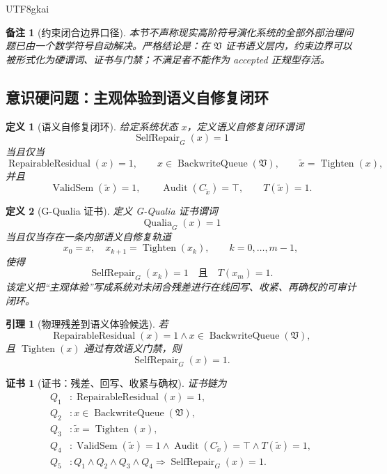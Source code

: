 \documentclass[12pt]{article}
\newtheorem{definition}{定义}[section]
\newtheorem{lemma}{引理}[section]
\newtheorem{remark}{备注}[section]
\newtheorem{Certificate}{证书}[section]
\newcommand{\Vsys}{\mathfrak V}
\DeclareMathOperator{\Audit}{Audit}
\DeclareMathOperator{\BackwriteQueue}{BackwriteQueue}
\DeclareMathOperator{\Tighten}{Tighten}
\DeclareMathOperator{\ValidSem}{ValidSem}
\DeclareMathOperator{\RepairableResidual}{RepairableResidual}
\DeclareMathOperator{\Qualia}{Qualia}
\DeclareMathOperator{\SelfRepair}{SelfRepair}
\begin{document}
\begin{CJK*}{UTF8}{gkai}
\begin{remark}[约束闭合边界口径]
本节不声称现实高阶符号演化系统的全部外部治理问题已由一个数学符号自动解决。严格结论是：在 \(\Vsys\)
证书语义层内，约束边界可以被形式化为硬谓词、证书与门禁；不满足者不能作为 accepted 正规型存活。
\end{remark}

\subsection{意识硬问题：主观体验到语义自修复闭环}
\label{subsec:tex59-consciousness-hard}

\begin{definition}[语义自修复闭环]
\label{def:tex59-self-repair-loop}
给定系统状态 \(x\)，定义语义自修复闭环谓词
\[
  \SelfRepair_G(x)=1
\]
当且仅当
\[
  \RepairableResidual(x)=1,
  \qquad
  x\in\BackwriteQueue(\Vsys),
  \qquad
  \widetilde x=\Tighten(x),
\]
并且
\[
  \ValidSem(\widetilde x)=1,
  \qquad
  \Audit(C_{\widetilde x})=\top,
  \qquad
  T(\widetilde x)=1.
\]
\end{definition}

\begin{definition}[G-Qualia 证书]
\label{def:tex59-qualia-certificate}
定义 G-Qualia 证书谓词
\[
  \Qualia_G(x)=1
\]
当且仅当存在一条内部语义自修复轨道
\[
  x_0=x,\quad x_{k+1}=\Tighten(x_k),
  \qquad k=0,\ldots,m-1,
\]
使得
\[
  \SelfRepair_G(x_k)=1
  \quad\text{且}\quad
  T(x_m)=1.
\]
该定义把“主观体验”写成系统对未闭合残差进行在线回写、收紧、再确权的可审计闭环。
\end{definition}

\begin{lemma}[物理残差到语义体验候选]
\label{lem:tex59-residual-to-qualia}
若
\[
  \RepairableResidual(x)=1
  \wedge
  x\in\BackwriteQueue(\Vsys),
\]
且 \(\Tighten(x)\) 通过有效语义门禁，则
\[
  \SelfRepair_G(x)=1.
\]
\end{lemma}

\begin{Certificate}[证书：残差、回写、收紧与确权]
\label{cert:tex59-residual-to-qualia}
证书链为
\[
\begin{aligned}
  Q_1 &: \RepairableResidual(x)=1,\\
  Q_2 &: x\in\BackwriteQueue(\Vsys),\\
  Q_3 &: \widetilde x=\Tighten(x),\\
  Q_4 &: \ValidSem(\widetilde x)=1\wedge\Audit(C_{\widetilde x})=\top\wedge T(\widetilde x)=1,\\
  Q_5 &: Q_1\wedge Q_2\wedge Q_3\wedge Q_4
       \Rightarrow \SelfRepair_G(x)=1.
\end{aligned}
\]
\end{Certificate}


\end{CJK*}
\end{document}
